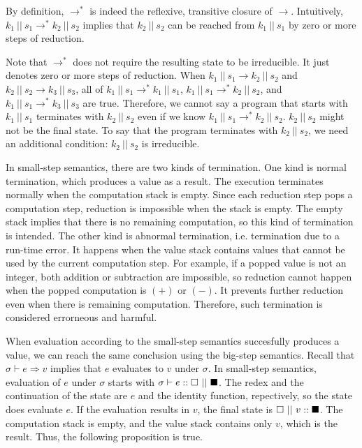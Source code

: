 By definition, $\rightarrow^\ast$ is indeed the reflexive, transitive
closure of $\rightarrow$. Intuitively,
$k_1\ ||\ s_1\rightarrow^{\ast}k_2\ ||\ s_2$ implies that $k_2\ ||\ s_2$
can be reached from $k_1\ ||\ s_1$ by zero or more steps of reduction.

Note that $\rightarrow^\ast$ does not require the resulting state to be
irreducible. It just denotes zero or more steps of reduction.
When $k_1\ ||\ s_1\rightarrow k_2\ ||\ s_2$ and $k_2\ ||\ s_2\rightarrow k_3\
||\ s_3$,
all of $k_1\ ||\ s_1\rightarrow^\ast k_1\
||\ s_1$, $k_1\ ||\ s_1\rightarrow^\ast k_2\ ||\ s_2$, and $k_1\ ||\
s_1\rightarrow^\ast k_3\ ||\ s_3$ are true.
Therefore, we cannot say a program that starts with $k_1\ ||\ s_1$ terminates with
$k_2\ ||\ s_2$ even if we know $k_1\ ||\ s_1\rightarrow^\ast k_2\ ||\ s_2$. $k_2\ ||\ s_2$
might not be the final state. To say that the program terminates with $k_2\ ||\
s_2$, we need an additional condition: $k_2\ ||\ s_2$ is irreducible.

In small-step
semantics, there are two kinds of termination. One kind is normal
termination, which produces a value as a result. The execution terminates
normally when the computation stack is empty. Since each reduction step pops a
computation step, reduction is impossible when the stack is empty. The empty
stack implies that there is no remaining computation, so this kind of
termination is intended. The other kind is abnormal termination, i.e.
termination due to a run-time error. It happens when the value stack contains
values that cannot be used by the current computation step. For example,
if a popped value is not an integer, both addition or subtraction are
impossible, so reduction cannot happen when the popped computation is $(+)$ or
$(-)$. It prevents further reduction even when
there is remaining computation. Therefore, such termination is considered
errorneous and harmful.

When evaluation according to the small-step semantics succesfully produces a
value, we can reach the same conclusion using the big-step semantics.
Recall that $\sigma\vdash e\Rightarrow v$ implies that $e$ evaluates to $v$
under $\sigma$. In small-step semantics, evaluation of $e$ under $\sigma$ starts
with $\evalk{\sigma}{e}\mtk\ ||\ \mts$. The redex and the continuation of the
state are $e$ and the identity function, repectively, so the state does evaluate
$e$. If the evaluation results in $v$, the final state is
$\mtk\ ||\ \conss{v}\mts$. The computation stack is empty, and the value stack
contains only $v$, which is the result. Thus, the following proposition is true.


